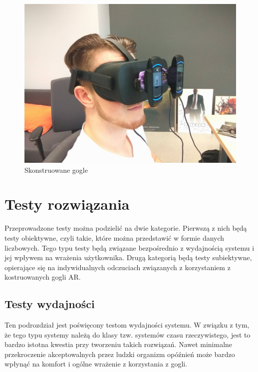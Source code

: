 \documentclass[a4paper,11pt,twoside]{report}
\theoremstyle{definition}
\begin{document}
\begin{figure}[H]
\centering
\includegraphics[scale=0.2]{images/googleWithCameras}
\caption[Skonstruowane gogle]{Skonstruowane gogle}
\end{figure}

\section{Testy rozwiązania}
Przeprowadzone testy można podzielić na dwie kategorie. Pierwszą z nich będą testy obiektywne, czyli takie, które można przedstawić w formie danych liczbowych. Tego typu testy będą związane bezpośrednio z wydajnością systemu i jej wpływem na wrażenia użytkownika. Drugą kategorią będą testy subiektywne, opierające się na indywidualnych odczuciach związanych z korzystaniem z kostruowanych gogli AR. 

\subsection{Testy wydajności}
Ten podrozdział jest poświęcony testom wydajności systemu. W związku z tym, że tego typu systemy należą do klasy tzw. systemów czasu rzeczywistego, jest to bardzo istotna kwestia przy tworzeniu takich rozwiązań. Nawet minimalne przekroczenie akceptowalnych przez ludzki organizm opóźnień może bardzo wpłynąć na komfort i ogólne wrażenie z korzystania z gogli.
\end{document}
